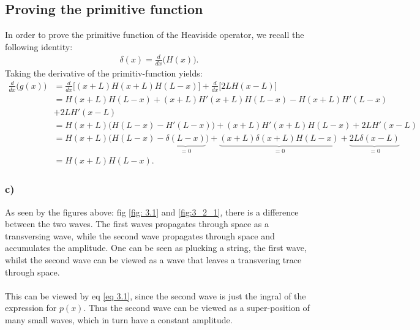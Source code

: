 \documentclass{article}
\begin{document}
\subsection*{Proving the primitive function}
In order to prove the primitive function of the Heaviside operator, we recall the following identity:
\begin{align*}
    \delta(x) = \frac{d}{dx}\Big(H(x)\Big).
\end{align*}Taking the derivative of the primitiv-function yields:
\begin{align*}
    \frac{d}{dx}\big(g(x)\big) &=\frac{d}{dx}\Big[(x + L)H(x + L)H(L-x)\Big] + \frac{d}{dx}\Big[2LH(x-L)\Big]\\
    &=H(x+L)H(L-x) + (x+L)H'(x+L)H(L-x) - H(x+L)H'(L-x)\\
    &+2LH'(x-L)\\
    &= H(x+L)\Big(H(L-x) - H'(L-x)\Big) + (x+L)H'(x+L)H(L-x) + 2LH'(x-L)\\
    &= H(x+L)\Big(H(L-x) - \underbrace{\delta(L-x)}_{=0}\Big) + \underbrace{(x+L)\delta(x+L)H(L-x)}_{=0} + \underbrace{2L\delta(x-L)}_{=0}\\
    &= H(x+L)H(L-x).
\end{align*}

\subsubsection*{c)}
As seen by the figures above: fig \ref{fig: 3.1} and \ref{fig:3_2_1}, there is a difference between the two waves. The first waves propagates through space as a transversing wave, while the second wave propagates through space and accumulates
the amplitude. One can be seen as plucking a string, the first wave, whilst the second wave can be viewed as a wave that leaves a transvering trace through space.
\\
\\
This can be viewed by eq \eqref{eq 3.1}, since the second wave is just the ingral of the expression for $p(x)$. Thus the second wave can be viewed as a super-position of many small waves, which in turn have a constant amplitude.
\end{document}
